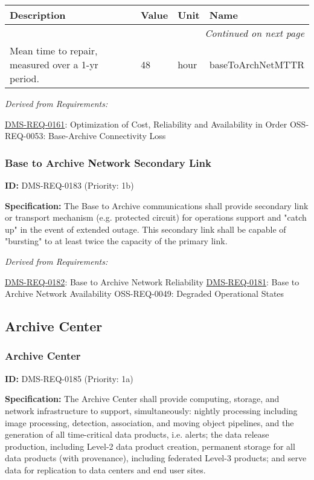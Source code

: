 \documentclass[SE,toc,lsstdraft]{lsstdoc}
\makeatletter
\newcommand{\paramname}[1]{\hspace{0pt}#1}
\newcommand{\unitname}[1]{\hspace{0pt}#1}
\newenvironment{parameters}[0]{%
\setlength\LTleft{0pt}
\setlength\LTright{\fill}
\begin{small}
\begin{longtable}[]{|p{0.49\textwidth}|l|p{0.6in}|p{1.70in}@{}|}

\hline \textbf{Description} & \textbf{Value} & \textbf{Unit} & \textbf{Name} \\ \hline
\endhead

\hline \multicolumn{4}{r}{\emph{Continued on next page}} \\
\endfoot

\hline\hline
\endlastfoot
}{%
\hline
\end{longtable}
\end{small}
}
\makeatother
\begin{document}
\begin{parameters}
Mean time to repair, measured over a 1-yr period.
&
48
&
\unitname{%
hour
}
&
\paramname{%
baseToArchNetMTTR
} \\\hline
\end{parameters}

\emph{Derived from Requirements:}

\hyperref[DMS-REQ-0161]{DMS-REQ-0161}:
Optimization of Cost, Reliability and Availability in Order \newline
OSS-REQ-0053:
Base-Archive Connectivity Loss \newline

\subsubsection{Base to Archive Network Secondary Link}

\label{DMS-REQ-0183}
\textbf{ID:} DMS-REQ-0183 (Priority: 1b)

\textbf{Specification: }The Base to Archive communications shall provide secondary link or transport mechanism (e.g. protected circuit) for operations support and "catch up"  in the event of extended outage.  This secondary link shall be capable of "bursting" to at least twice the capacity of the primary link.

\emph{Derived from Requirements:}

\hyperref[DMS-REQ-0182]{DMS-REQ-0182}:
Base to Archive Network Reliability \newline
\hyperref[DMS-REQ-0181]{DMS-REQ-0181}:
Base to Archive Network Availability \newline
OSS-REQ-0049:
Degraded Operational States \newline

\subsection{Archive Center}

\subsubsection{Archive Center}

\label{DMS-REQ-0185}
\textbf{ID:} DMS-REQ-0185 (Priority: 1a)

\textbf{Specification:} The Archive Center shall provide computing, storage, and network infrastructure to support, simultaneously: nightly processing including image processing, detection, association, and moving object pipelines, and the generation of all time-critical data products, i.e. alerts; the data release production, including Level-2 data product creation, permanent storage for all data products (with provenance), including federated Level-3 products; and serve data for replication to data centers and end user sites.
\end{document}
